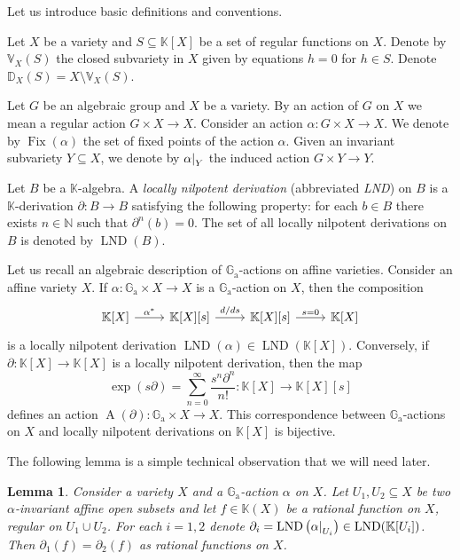 \documentclass[a4paper, 12pt, reqno]{amsart}
\newcommand{\bb}{\mathbb}
\newcommand{\der}{\partial}
\newcommand{\Ga}{\bb{G}_\mathrm{a}}
\DeclareMathOperator{\A}{A}
\DeclareMathOperator{\Fix}{Fix}
\DeclareMathOperator{\LND}{LND}
\newcommand{\restrict}[2]{
    \left.
    \kern-\nulldelimiterspace{#1}
    \right|_{#2}
}
\theoremstyle{definition}
\theoremstyle{plain}
\newtheorem{lemm}[counter]{Lemma}
\begin{document}

Let us introduce basic definitions and conventions.

\smallskip

Let $X$ be a variety and $S \subseteq \bb{K}[X]$ be a set of regular functions on $X$. Denote by $\bb{V}_X(S)$ the closed subvariety in $X$ given by equations $h = 0$ for $h \in S$. Denote $\bb{D}_X(S) = X \setminus \bb{V}_X(S)$.

Let $G$ be an algebraic group and $X$ be a variety. By an action of $G$ on $X$ we mean a regular action $G \times X \to X$. Consider an action $\alpha \colon G \times X \to X$. We denote by $\Fix(\alpha)$ the set of fixed points of the action $\alpha$. Given an invariant subvariety $Y \subseteq X$, we denote by $\restrict{\alpha}{Y}$ the induced action $G \times Y \to Y$.

Let $B$ be a $\bb{K}$-algebra. A \emph{locally nilpotent derivation} (abbreviated \emph{LND}) on $B$ is a
\linebreak
$\bb{K}$-derivation $\der \colon B \to B$ satisfying the following property: for each $b \in B$ there exists $n \in \bb{N}$ such that $\der^n(b) = 0$. The set of all locally nilpotent derivations on $B$ is denoted by $\LND(B)$.

\smallskip

Let us recall an algebraic description of $\Ga$-actions on affine varieties. Consider an affine variety $X$. If $\alpha \colon \Ga \times X \to X$ is a $\Ga$-action on $X$, then the composition
$$
\begin{tikzcd}
\bb{K}[X] \ar{r}{\alpha^*} & \bb{K}[X][s] \ar{r}{d / d s} &
\bb{K}[X][s] \ar{r}{s = 0} & \bb{K}[X]
\end{tikzcd}
$$
is a locally nilpotent derivation $\LND(\alpha) \in \LND(\bb{K}[X])$. Conversely, if $\der \colon \bb{K}[X] \to \bb{K}[X]$ is a locally nilpotent derivation, then the map
$$
\exp(s \der) =
\sum_{n = 0}^\infty \frac{s^n \der^n}{n!} \colon
\bb{K}[X] \to \bb{K}[X][s]
$$
defines an action $\A(\der) \colon \Ga \times X \to X$. This correspondence between $\Ga$-actions on $X$ and locally nilpotent derivations on $\bb{K}[X]$ is bijective.

The following lemma is a simple technical observation that we will need later.

\begin{lemm} \label{GD.le}
Consider a variety $X$ and a $\Ga$-action $\alpha$ on $X$. Let $U_1, U_2 \subseteq X$ be two
\linebreak
$\alpha$-invariant affine open subsets and let $f \in \bb{K}(X)$ be a rational function on $X$, regular on $U_1 \cup U_2$. For each $i = 1, 2$ denote $\der_i = \LND \left( \restrict{\alpha}{U_i} \right) \in \LND(\bb{K}[U_i])$. Then $\der_1(f) = \der_2(f)$ as rational functions on $X$.
\end{lemm}
\end{document}
